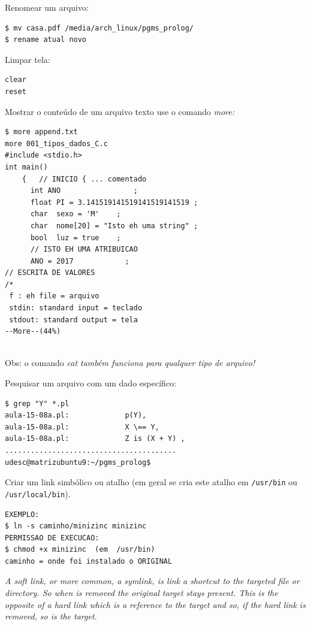 \documentclass[final,a4paper]{article}
\begin{document}
\begin{description}
\pagebreak
\item[\ding{248}] Renomear um arquivo:
\begin{verbatim}
$ mv casa.pdf /media/arch_linux/pgms_prolog/
$ rename atual novo

\end{verbatim}




\pagebreak
\item[\ding{248}] Limpar tela:
\begin{verbatim}
clear
reset

\end{verbatim}


\pagebreak
\item[\ding{248}] Mostrar o conteúdo de um arquivo texto use o comando
\em{more}:
\begin{verbatim}
$ more append.txt 
more 001_tipos_dados_C.c 
#include <stdio.h>
int main()
	{   // INICIO { ... comentado
	  int ANO	              ;
	  float PI = 3.141519141519141519141519 ;
	  char  sexo = 'M'    ; 
	  char  nome[20] = "Isto eh uma string" ; 
	  bool  luz = true    ;
	  // ISTO EH UMA ATRIBUICAO
	  ANO = 2017            ;	  
// ESCRITA DE VALORES	  
/*
 f : eh file = arquivo
 stdin: standard input = teclado
 stdout: standard output = tela
--More--(44%)


\end{verbatim}
Obs: o comando \em{cat} também funciona para qualquer tipo de arquivo!

\pagebreak
\item[\ding{248}] Pesquisar um arquivo com um dado específico:
\begin{verbatim}
$ grep "Y" *.pl
aula-15-08a.pl:			    p(Y), 
aula-15-08a.pl:			    X \== Y, 
aula-15-08a.pl:			    Z is (X + Y) ,
........................................
udesc@matrizubuntu9:~/pgms_prolog$ 

\end{verbatim}

\pagebreak
\item[\ding{248}] Criar um link simbólico ou atalho (em geral se cria este atalho em \texttt{/usr/bin} ou \texttt{/usr/local/bin}). 

\begin{verbatim}
EXEMPLO:
$ ln -s caminho/minizinc minizinc
PERMISSAO DE EXECUCAO:
$ chmod +x minizinc  (em  /usr/bin)
caminho = onde foi instalado o ORIGINAL
\end{verbatim}

\emph{A soft link, or more common, a symlink, is link a shortcut to the targeted file or directory. So when is removed the original target stays present. This is the opposite of a hard link which is a reference to the target and so, if the hard link is removed, so is the target.}


\end{description}
\end{document}
